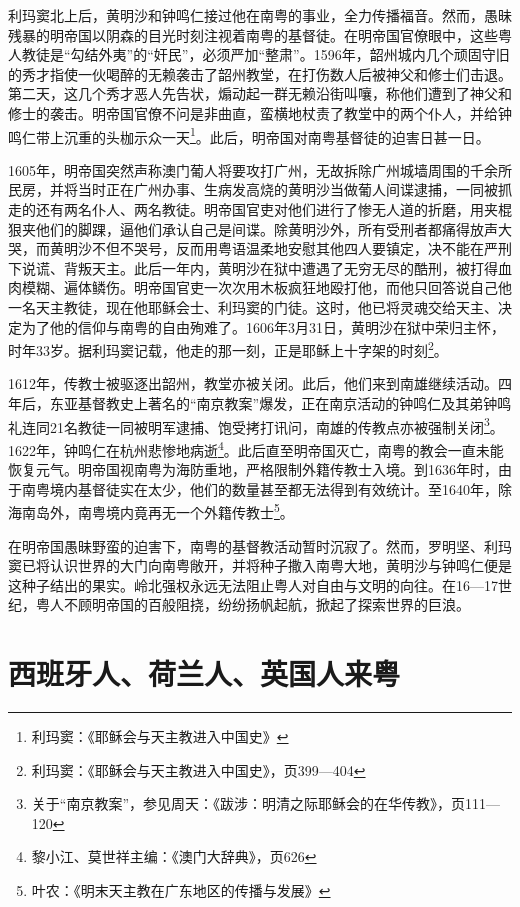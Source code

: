 利玛窦北上后，黄明沙和钟鸣仁接过他在南粤的事业，全力传播福音。然而，愚昧残暴的明帝国以阴森的目光时刻注视着南粤的基督徒。在明帝国官僚眼中，这些粤人教徒是“勾结外夷”的“奸民”，必须严加“整肃”。1596年，韶州城内几个顽固守旧的秀才指使一伙喝醉的无赖袭击了韶州教堂，在打伤数人后被神父和修士们击退。第二天，这几个秀才恶人先告状，煽动起一群无赖沿街叫嚷，称他们遭到了神父和修士的袭击。明帝国官僚不问是非曲直，蛮横地杖责了教堂中的两个仆人，并给钟鸣仁带上沉重的头枷示众一天\footnote{利玛窦：《耶稣会与天主教进入中国史》}。此后，明帝国对南粤基督徒的迫害日甚一日。

1605年，明帝国突然声称澳门葡人将要攻打广州，无故拆除广州城墙周围的千余所民房，并将当时正在广州办事、生病发高烧的黄明沙当做葡人间谍逮捕，一同被抓走的还有两名仆人、两名教徒。明帝国官吏对他们进行了惨无人道的折磨，用夹棍狠夹他们的脚踝，逼他们承认自己是间谍。除黄明沙外，所有受刑者都痛得放声大哭，而黄明沙不但不哭号，反而用粤语温柔地安慰其他四人要镇定，决不能在严刑下说谎、背叛天主。此后一年内，黄明沙在狱中遭遇了无穷无尽的酷刑，被打得血肉模糊、遍体鳞伤。明帝国官吏一次次用木板疯狂地殴打他，而他只回答说自己他一名天主教徒，现在他耶稣会士、利玛窦的门徒。这时，他已将灵魂交给天主、决定为了他的信仰与南粤的自由殉难了。1606年3月31日，黄明沙在狱中荣归主怀，时年33岁。据利玛窦记载，他走的那一刻，正是耶稣上十字架的时刻\footnote{利玛窦：《耶稣会与天主教进入中国史》，页399—404}。

1612年，传教士被驱逐出韶州，教堂亦被关闭。此后，他们来到南雄继续活动。四年后，东亚基督教史上著名的“南京教案”爆发，正在南京活动的钟鸣仁及其弟钟鸣礼连同21名教徒一同被明军逮捕、饱受拷打讯问，南雄的传教点亦被强制关闭\footnote{关于“南京教案”，参见周天：《跋涉：明清之际耶稣会的在华传教》，页111—120}。1622年，钟鸣仁在杭州悲惨地病逝\footnote{黎小江、莫世祥主编：《澳门大辞典》，页626}。此后直至明帝国灭亡，南粤的教会一直未能恢复元气。明帝国视南粤为海防重地，严格限制外籍传教士入境。到1636年时，由于南粤境内基督徒实在太少，他们的数量甚至都无法得到有效统计。至1640年，除海南岛外，南粤境内竟再无一个外籍传教士\footnote{叶农：《明末天主教在广东地区的传播与发展》}。

在明帝国愚昧野蛮的迫害下，南粤的基督教活动暂时沉寂了。然而，罗明坚、利玛窦已将认识世界的大门向南粤敞开，并将种子撒入南粤大地，黄明沙与钟鸣仁便是这种子结出的果实。岭北强权永远无法阻止粤人对自由与文明的向往。在16—17世纪，粤人不顾明帝国的百般阻挠，纷纷扬帆起航，掀起了探索世界的巨浪。

\section{西班牙人、荷兰人、英国人来粤}

